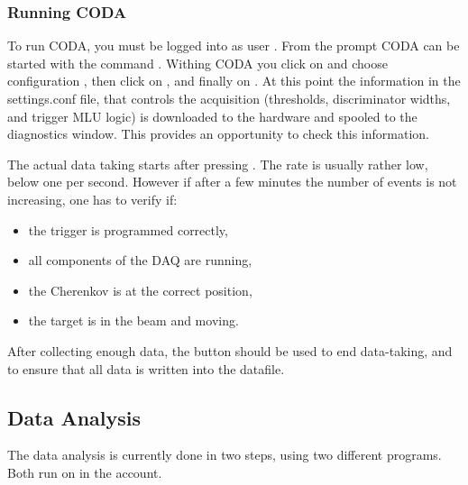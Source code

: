 {{\subsubsection{Running CODA \\ }

To run CODA, you must be logged into  as user
. From the prompt CODA can be started with the
command . Withing CODA you click 
on  and choose configuration ,
then click on , and finally on .
At this point the information in the settings.conf file,
 that controls the acquisition
(thresholds, discriminator widths, and trigger MLU logic) is downloaded to the
hardware and spooled to the diagnostics window. This provides an opportunity
to check this information.

The actual data taking starts after pressing . The rate 
is usually rather low, below one per second. However if after 
a few minutes the number of events is not increasing, one has to 
verify if:
\begin{itemize}
\item the trigger is programmed correctly,
\item all components of the DAQ are running,
\item the Cherenkov is at the correct position,
\item the target is in the beam and moving.
\end{itemize}
After collecting enough data, the  button should be used
to end data-taking, and to ensure that all data is written into the 
datafile.

\subsection{Data Analysis}
\label{sec:ep_analysis}

The data analysis is currently done in two steps, using
two different programs. Both run on  in the
 account.

}}
